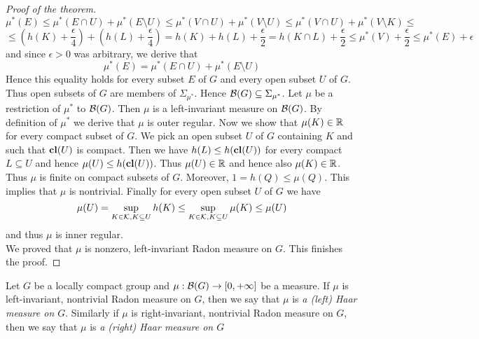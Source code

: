 \begin{proof}[Proof of the theorem]
$$\mu^*(E) \leq \mu^*(E\cap U) + \mu^*(E\setminus U) \leq \mu^*(V\cap U) + \mu^*(V\setminus U) \leq \mu^*(V\cap U) + \mu^*(V\setminus K)\leq $$
$$\leq \left(h(K)+\frac{\epsilon}{4}\right) + \left(h(L) + \frac{\epsilon}{4}\right)= h(K) + h(L) + \frac{\epsilon}{2} = h(K\cap L) + \frac{\epsilon}{2}\leq \mu^*(V) +\frac{\epsilon}{2} \leq \mu^*(E) + \epsilon$$
and since $\epsilon > 0$ was arbitrary, we derive that
$$\mu^*(E) = \mu^*(E\cap U) + \mu^*(E\setminus U)$$
Hence this equality holds for every subset $E$ of $G$ and every open subset $U$ of $G$. Thus open subsets of $G$ are members of $\Sigma_{\mu^*}$. Hence ${\mathcal B}(G)\subseteq \Sigma_{\mu^*}$. Let $\mu$ be a restriction of $\mu^*$ to ${\mathcal B}(G)$. Then $\mu$ is a left-invariant measure on ${\mathcal B}(G)$. By definition of $\mu^*$ we derive that $\mu$ is outer regular. Now we show that $\mu(K) \in {\mathbb R}$ for every compact subset of $G$. We pick an open subset $U$ of $G$ containing $K$ and such that $\mathbf{cl}(U)$ is compact. Then we have $h(L)\leq h(\mathbf{cl}(U))$ for every compact $L\subseteq U$ and hence $\mu(U)\leq h(\mathbf{cl}(U))$. Thus $\mu(U)\in {\mathbb R}$ and hence also $\mu(K) \in {\mathbb R}$. Thus $\mu$ is finite on compact subsets of $G$. Moreover, $1 = h(Q) \leq \mu(Q)$. This implies that $\mu$ is nontrivial. Finally for every open subset $U$ of $G$ we have
$$\mu(U) = \sup_{K\in {\mathcal K},K\subseteq U}h(K)\leq \sup_{K\in {\mathcal K},K\subseteq U}\mu(K)\leq \mu(U)$$
and thus $\mu$ is inner regular.\\
We proved that $\mu$ is nonzero, left-invariant Radon measure on $G$. This finishes the proof.
\end{proof}

\begin{definition}
Let $G$ be a locally compact group and $\mu:{\mathcal B}(G)\rightarrow [0,+\infty]$ be a measure. If $\mu$ is left-invariant, nontrivial Radon measure on $G$, then we say that $\mu$ is \textit{a (left) Haar measure on $G$}. Similarly if $\mu$ is right-invariant, nontrivial Radon measure on $G$, then we say that $\mu$ is \textit{a (right) Haar measure on $G$} 
\end{definition}






























\small



